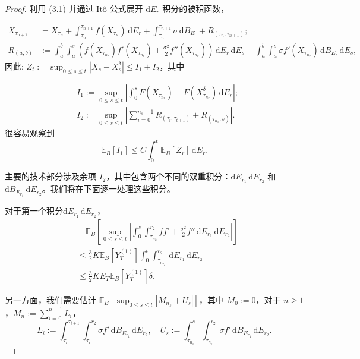 \begin{proof}
	
	利用 (3.1) 并通过 Itô 公式展开 $\mathrm{d}E_r$ 积分的被积函数，
	
	$$
	\begin{aligned}
		X_{\tau_{n+1}} &= X_{\tau_n} +  \int_{\tau_n}^{\tau_{n+1}} f(X_{\tau_n}) \, \mathrm{d}E_r + \int_{\tau_n}^{\tau_{n+1}} \sigma \, \mathrm{d}B_{E_r} + R_{(\tau_n, \tau_{n+1})}; \\
		R_{(a,b)} &:=  \int_a^b \int_a^{s} \left( f(X_{\tau_{n_{r}}})f'(X_{\tau_{n_{r}}}) + \frac{\sigma ^2}{2} f''(X_{\tau_{n_{r}}})  \right) \, \mathrm{d}E_{r} \, \mathrm{d}E_{s} + \int_a^b \int_a^{s} \sigma f'(X_{\tau_{n_{r}}})   \, \mathrm{d}B_{E_{r}} \, \mathrm{d}E_{s},
	\end{aligned}
	$$
	因此:
	$Z_t := \sup_{0 \leq s \leq t} | X_s - {X_s^\delta} | \leq I_1 + I_2 $，其中
	
	$$
	\begin{aligned}
		&I_1 := \sup_{0 \leq s \leq t} \left| \int_0^s F(X_{\tau_{n_r}}) - F(X_{\tau_{n_r}}^\delta)  \, \mathrm{d}E_r \right|; \\
		&I_2 := \sup_{0 \leq s \leq t} \left| \sum_{i=0}^{n_s - 1} R_{(\tau_{t}, \tau_{t+1})} + R_{(\tau_{n_s}, s)} \right|.
	\end{aligned}
	$$
	很容易观察到
	\begin{equation}\label{I1}
		\mathbb{E}_B[I_1] \leq C \int_0^t \mathbb{E}_B[Z_r] \, \mathrm{d}E_r.
	\end{equation}

	主要的技术部分涉及余项 $I_2$，其中包含两个不同的双重积分：$\mathrm{d}E_{r_1} \, \mathrm{d}E_{r_2}$ 和 $\mathrm{d}B_{E_{r_1}} \, \mathrm{d}E_{r_2}$。我们将在下面逐一处理这些积分。
	
	对于第一个积分$ \mathrm{d}E_{r_1} \, \mathrm{d}E_{r_2}$，
	\begin{align}
		& \quad \mathbb{E}_B \left[\sup_{0 \leq s \leq t} \left| \int_0^s \int_{\tau_{n_2}}^{r_2} ff'  + \frac{\sigma^2}{2} f'' \, \mathrm{d}E_{r_1} \, \mathrm{d}E_{r_2} \right|\right] \nonumber \\
		&\leq  \frac{3}{2}K \mathbb{E}_B[Y_T^{(1)}] \int_0^t \int_{\tau_{n_{r_2}}}^{r_2} \, \mathrm{d}E_{r_1} \, \mathrm{d}E_{r_2} \nonumber \\
		&\leq  \frac{3}{2}K E_T \mathbb{E}_B[Y_T^{(1)}] \delta.  \label{I21}
	\end{align}
	
	另一方面，我们需要估计 $\mathbb{E}_B \left[\sup_{0 \leq s \leq t} |M_{n_s} + U_s|\right]$，其中 $M_0 := 0$，对于 $n \geq 1$，$M_n := \sum_{i=0}^{n-1} L_i$，
	$$
	L_i := \int_{\tau_i}^{\tau_{i+1}} \int_{\tau_i}^{r_2} \sigma f' \, \mathrm{d}B_{E_{r_1}} \, \mathrm{d}E_{r_2}, \quad U_s := \int_{\tau_{n_s}}^s \int_{\tau_{n_s}}^{r_2} \sigma f' \, \mathrm{d}B_{E_{r_1}} \, \mathrm{d}E_{r_2}.
	$$
	

\end{proof}
